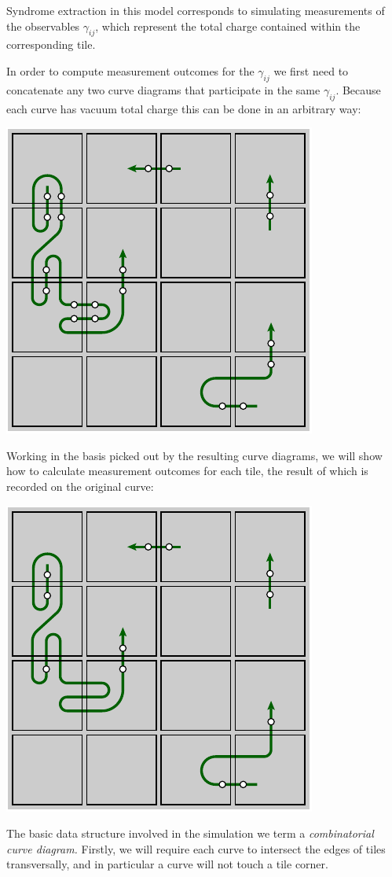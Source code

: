 \documentclass[aps, letterpaper, onecolumn, superscriptaddress, notitlepage, 10pt]{revtex4-1}
\begin{document}
Syndrome extraction in this model corresponds to simulating measurements of the observables $\gamma_{ij}$, which represent the total charge contained within the corresponding tile.

In order to compute measurement outcomes for the $\gamma_{ij}$
we first need to concatenate any two curve diagrams that 
participate in the same $\gamma_{ij}.$
Because each curve has vacuum total charge this can be
done in an arbitrary way:
\begin{center}
\includegraphics[width=0.3\columnwidth ]{pic-join-pairs.pdf}
\end{center}

Working in the basis picked out by the resulting curve
diagrams, we will show how to calculate measurement outcomes for each tile,
the result of which is recorded on the original curve:
\begin{center}
\includegraphics[width=0.3\columnwidth ]{pic-curve-uniq.pdf}
\end{center}



%
%

The basic data structure involved in the
simulation we term a \emph{combinatorial curve diagram.}
Firstly, we will require each curve to intersect 
the edges of tiles transversally,
and in particular a curve will not touch a tile corner.
\end{document}
